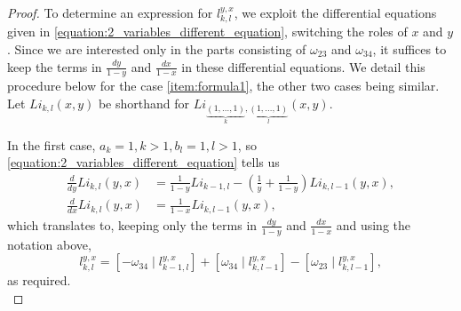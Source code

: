 \documentclass[a4paper,fleqn]{cas-sc}
\begin{document}
\begin{proof}
To determine an expression for $l_{k,l}^{y,x}$, we exploit the differential equations given in \eqref{equation:2_variables_different_equation}, switching the roles of $x$ and $y$. Since we are interested only in the parts consisting of $\omega_{23}$ and $\omega_{34}$, it suffices to keep the terms in $\frac{dy}{1-y}$ and $\frac{dx}{1-x}$ in these differential equations. We detail this procedure below for the case \ref{item:formula1}, the other two cases being similar. Let $Li_{k,l}(x,y)$ be shorthand for $Li_{\underbrace{(1, \ldots,1)}_k,\underbrace{(1, \ldots,1)}_l}(x,y)$.

In the first case, $a_k =1, k>1, b_l=1, l>1$, so \eqref{equation:2_variables_different_equation} tells us 
\begin{equation*}
\begin{split}
    \frac{d}{dy} Li_{k,l}(y,x) & = \frac{1}{1-y}Li_{k-1,l}-(\frac{1}{y}+\frac{1}{1-y})Li_{k,l-1}(y,x),\\
    \frac{d}{dx} Li_{k,l}(y,x) & = \frac{1}{1-x}Li_{k,l-1}(y,x),
\end{split}   
\end{equation*}
which translates to, keeping only the terms in $\frac{dy}{1-y}$ and $\frac{dx}{1-x}$ and using the notation above,
\begin{equation*}
    l_{k,l}^{y,x} = [-\omega_{34} \mid l_{k-1,l}^{y,x}] + [\omega_{34} \mid l_{k,l-1}^{y,x}] - [\omega_{23} \mid l_{k,l-1}^{y,x}],
\end{equation*}
as required.\\



\end{proof}
\end{document}
